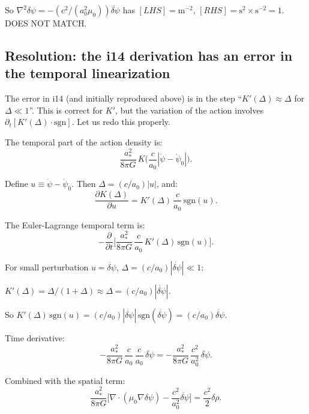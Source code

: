 \documentclass[11pt]{article}
\begin{document}
So $\nabla^2\delta\psi = -(c^2/(a_0^2\mu_0))\ddot{\delta\psi}$
has $[LHS] = \text{m}^{-2}$, $[RHS] = \text{s}^2 \times \text{s}^{-2}
= 1$. DOES NOT MATCH.

\subsection{Resolution: the i14 derivation has an error in the
temporal linearization}

The error in i14 (and initially reproduced above) is in the step
``$K'(\Delta) \approx \Delta$ for $\Delta \ll 1$''. This is correct
for $K'$, but the variation of the action involves $\partial_t[K'(\Delta)
\cdot \text{sgn}]$. Let us redo this properly.

The temporal part of the action density is:
\begin{equation}
\frac{a_*^2}{8\pi G}\,K\!\biggl(\frac{c}{a_0}|\dot\psi - \dot\psi_0|\biggr).
\end{equation}

Define $u \equiv \dot\psi - \dot\psi_0$. Then $\Delta = (c/a_0)|u|$, and:
\begin{equation}
\frac{\partial K(\Delta)}{\partial u} = K'(\Delta)\,\frac{c}{a_0}\,\text{sgn}(u).
\end{equation}

The Euler-Lagrange temporal term is:
\begin{equation}
-\frac{\partial}{\partial t}\biggl[\frac{a_*^2}{8\pi G}\,\frac{c}{a_0}\,
K'(\Delta)\,\text{sgn}(u)\biggr].
\end{equation}

For small perturbation $u = \dot{\delta\psi}$, $\Delta = (c/a_0)|\dot{\delta\psi}|
\ll 1$:

$K'(\Delta) = \Delta/(1+\Delta) \approx \Delta = (c/a_0)|\dot{\delta\psi}|$.

So $K'(\Delta)\,\text{sgn}(u) = (c/a_0)|\dot{\delta\psi}|\,\text{sgn}(\dot{\delta\psi})
= (c/a_0)\dot{\delta\psi}$.

Time derivative:
\begin{equation}
-\frac{a_*^2}{8\pi G}\,\frac{c}{a_0}\,\frac{c}{a_0}\,\ddot{\delta\psi}
= -\frac{a_*^2}{8\pi G}\,\frac{c^2}{a_0^2}\,\ddot{\delta\psi}.
\end{equation}

Combined with the spatial term:
\begin{equation}
\frac{a_*^2}{8\pi G}\biggl[\nabla\cdot(\mu_0\nabla\delta\psi)
- \frac{c^2}{a_0^2}\ddot{\delta\psi}\biggr] = \frac{c^2}{2}\delta\rho.
\end{equation}
\end{document}
